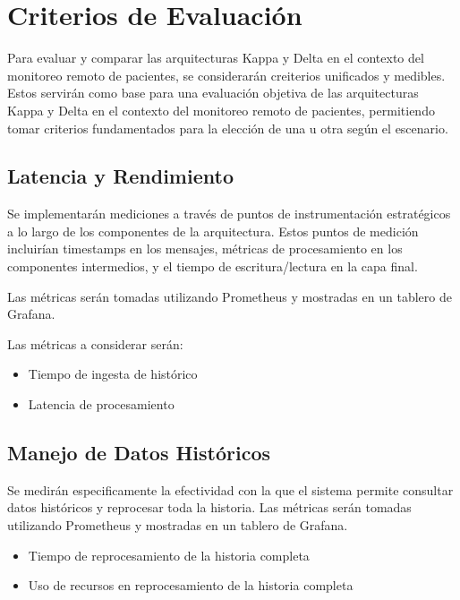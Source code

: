 \section{Criterios de Evaluación}

Para evaluar y comparar las arquitecturas Kappa y Delta en el contexto del monitoreo remoto de pacientes, se considerarán creiterios unificados y medibles.
Estos servirán como base para una evaluación objetiva de las arquitecturas Kappa y Delta en el contexto del monitoreo remoto de pacientes, permitiendo tomar criterios 
fundamentados para la elección de una u otra según el escenario.

\newpage

\subsection{Latencia y Rendimiento}

Se implementarán mediciones a través de puntos de instrumentación estratégicos a lo largo de los componentes de la arquitectura.  
Estos puntos de medición incluirían timestamps en los mensajes, métricas de procesamiento en los componentes intermedios, y el tiempo de escritura/lectura en la capa final. 

Las métricas serán tomadas utilizando Prometheus y mostradas en un tablero de Grafana.

Las métricas a considerar serán:
\begin{itemize}
    \item Tiempo de ingesta de histórico
    \item Latencia de procesamiento
\end{itemize}

\subsection{Manejo de Datos Históricos}

Se medirán especificamente la efectividad con la que el sistema permite consultar datos históricos y reprocesar toda la historia.
Las métricas serán tomadas utilizando Prometheus y mostradas en un tablero de Grafana.

\begin{itemize}
    \item Tiempo de reprocesamiento de la historia completa
    \item Uso de recursos en reprocesamiento de la historia completa
\end{itemize}


